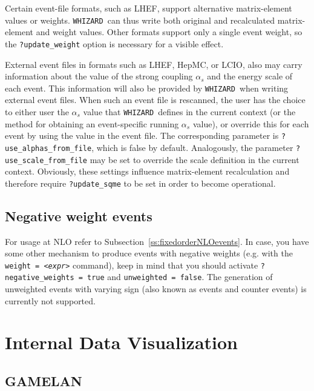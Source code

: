 \documentclass[12pt]{book}
\newcommand{\ttt}[1]{\texttt{#1}}
\newcommand{\whizard}{\ttt{WHIZARD}}
\begin{document}
Certain event-file formats, such as LHEF, support alternative
matrix-element values or weights.  \whizard\ can thus write both
original and
recalculated matrix-element and weight values.
Other formats support only a single
event weight, so the \ttt{?update\_weight} option is necessary for a
visible effect.

External event files in formats such as LHEF, HepMC, or LCIO, also may
carry information about the value of the strong coupling $\alpha_s$
and the energy scale of each event.  This information will also be
provided by \whizard\ when writing external event files.  When such an
event file is rescanned, the user has the choice to either user the
$\alpha_s$ value that \whizard\ defines in the current context (or the
method for obtaining an event-specific running $\alpha_s$ value), or
override this for each event by using the value in the event file.
The corresponding parameter is \ttt{?use\_alphas\_from\_file}, which
is false by default.  Analogously, the parameter
\ttt{?use\_scale\_from\_file} may be set to override the scale
definition in the current context.  Obviously, these settings
influence matrix-element recalculation and therefore require
\ttt{?update\_sqme} to be set in order to become operational.


\section{Negative weight events}
For usage at NLO refer to Subsection~\ref{ss:fixedorderNLOevents}.
In case, you have some other mechanism to produce events with negative
weights (e.g. with the \ttt{weight = {\em <expr>}} command), keep in
mind that you should activate \ttt{?negative\_weights = true} and
\ttt{unweighted = false}.  The generation of unweighted events with
varying sign (also known as events and counter events) is currently not
supported.

\chapter{Internal Data Visualization}
\label{chap:visualization}

\section{GAMELAN}
\end{document}
